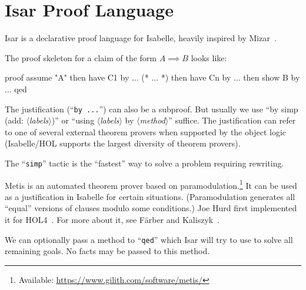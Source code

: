 \section{Isar Proof Language}

\begin{node}\label{isabelle:isar-0000}%
Isar is a declarative proof language for Isabelle, heavily inspired by
Mizar~.
\end{node}

\begin{node}\label{isabelle:isar-0001}%
  The proof skeleton for a claim of the form $A\implies B$ looks like:
\begin{Isabelle}
proof
  assume "A"
  then have C1 by ...
  (* ... *)
  then have Cn by ...
  then show B by ...
qed
\end{Isabelle}

\begin{node}\label{isabelle:isar-0002}%
The justification (``\texttt{by ...}'') can also be a subproof. But
usually we use ``by simp (add: $\langle$\textit{labels\/}$\rangle$)'' or
``using $\langle$\textit{labels\/}$\rangle$ by $\langle$\textit{method\/}$\rangle$'' suffice. The
justification can refer to one of several external theorem provers when
supported by the object logic (Isabelle/HOL supports the largest
diversity of theorem provers).

\begin{node}\label{isabelle:isar-0004}%
The ``\texttt{simp}'' tactic is the ``fastest'' way to solve a problem
requiring rewriting.
\end{node}

\begin{node}[Metis]\label{isabelle:isar-0003}%
Metis%
is an automated theorem prover based on
paramodulation.\footnote{Available: \url{https://www.gilith.com/software/metis/}}
It can be used as a justification in Isabelle for certain
situations. (Paramodulation generates all ``equal'' versions of clauses
modulo some conditions.)
Joe Hurd first implemented it for HOL4~\cite{hurd2003first}.
For more about it, see F{\"{a}}rber and Kaliszyk~\cite{farber2015metis}.
\end{node}
\end{node}

\begin{node}\label{isabelle:isar-0005}%
We can optionally pass a method to ``\texttt{qed}'' which Isar will try
to use to solve all remaining goals. No facts may be passed to this method.
\end{node}
\end{node}